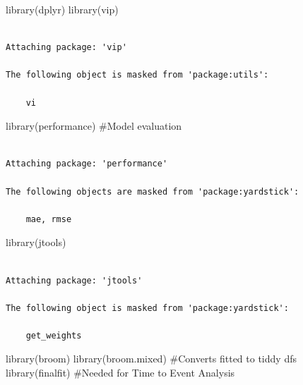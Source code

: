 \documentclass[
  letterpaper,
  DIV=11,
  numbers=noendperiod]{scrartcl}
\newenvironment{Shaded}{}{}
\newcommand{\CommentTok}[1]{\textcolor[rgb]{0.42,0.45,0.49}{#1}}
\newcommand{\FunctionTok}[1]{\textcolor[rgb]{0.44,0.26,0.76}{#1}}
\newcommand{\NormalTok}[1]{\textcolor[rgb]{0.14,0.16,0.18}{#1}}
\begin{document}
\begin{Shaded}
\begin{Highlighting}[]
\FunctionTok{library}\NormalTok{(dplyr)}
\FunctionTok{library}\NormalTok{(vip)}
\end{Highlighting}
\end{Shaded}

\begin{verbatim}

Attaching package: 'vip'

The following object is masked from 'package:utils':

    vi
\end{verbatim}

\begin{Shaded}
\begin{Highlighting}[]
\FunctionTok{library}\NormalTok{(performance) }\CommentTok{\#Model evaluation}
\end{Highlighting}
\end{Shaded}

\begin{verbatim}

Attaching package: 'performance'

The following objects are masked from 'package:yardstick':

    mae, rmse
\end{verbatim}

\begin{Shaded}
\begin{Highlighting}[]
\FunctionTok{library}\NormalTok{(jtools)}
\end{Highlighting}
\end{Shaded}

\begin{verbatim}

Attaching package: 'jtools'

The following object is masked from 'package:yardstick':

    get_weights
\end{verbatim}

\begin{Shaded}
\begin{Highlighting}[]
\FunctionTok{library}\NormalTok{(broom)}
\FunctionTok{library}\NormalTok{(broom.mixed) }\CommentTok{\#Converts fitted to tiddy dfs}
\FunctionTok{library}\NormalTok{(finalfit) }\CommentTok{\#Needed for Time to Event Analysis }
\end{Highlighting}
\end{Shaded}
\end{document}
